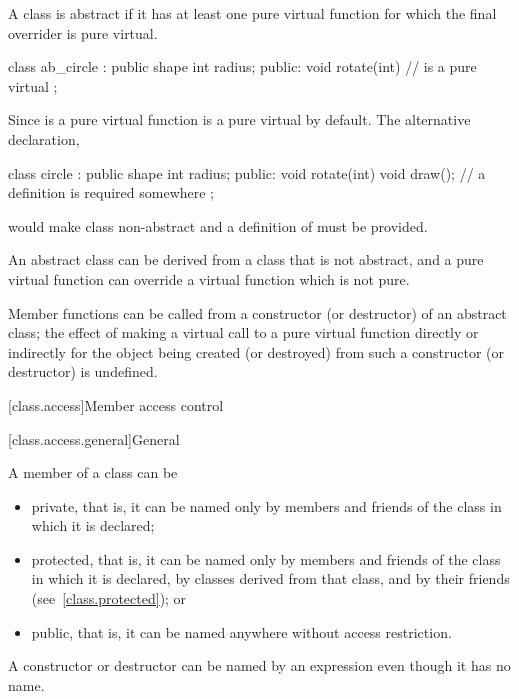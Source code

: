 \pnum
{}%
A class is abstract if it has at least one pure virtual
function for which the final overrider is pure virtual.
\begin{example}
\begin{codeblock}
class ab_circle : public shape {
  int radius;
public:
  void rotate(int) { }
  //  is a pure virtual
};
\end{codeblock}

Since  is a pure virtual function
 is a pure virtual by default. The alternative
declaration,
\begin{codeblock}
class circle : public shape {
  int radius;
public:
  void rotate(int) { }
  void draw();                  // a definition is required somewhere
};
\end{codeblock}
would make class  non-abstract and a definition of
 must be provided.
\end{example}

\pnum
\begin{note}
An abstract class can be derived from a class that is not abstract, and
a pure virtual function can override a virtual function which is not
pure.
\end{note}

\pnum
{}%
Member functions can be called from a constructor (or destructor) of an
abstract class;
%
the effect of making a virtual call to a pure
virtual function directly or indirectly for the object being created (or
destroyed) from such a constructor (or destructor) is undefined.%

[class.access]{Member access control}%

[class.access.general]{General}%


\pnum
A member of a class can be
\begin{itemize}
\item
{}%
private,
that is, it can be named only by members and friends
of the class in which it is declared;
\item
{}%
protected,
that is, it can be named only by members and friends
of the class in which it is declared, by classes derived from that class, and by their
friends (see~\ref{class.protected}); or
\item
{}%
public,
that is, it can be named anywhere without access restriction.
\end{itemize}
\begin{note}
A constructor or destructor can be named by an expression
even though it has no name.
\end{note}

